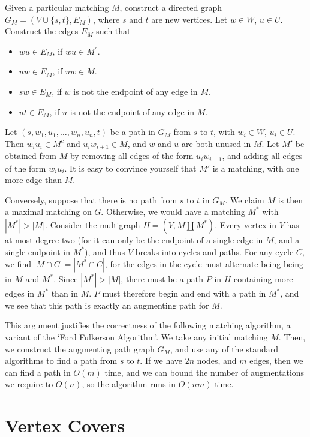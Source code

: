 Given a particular matching $M$, construct a directed graph $G_M = (V \cup \{ s, t \},E_M)$, where $s$ and $t$ are new vertices. Let $w \in W$, $u \in U$. Construct the edges $E_M$ such that
%
\begin{itemize}
    \item $wu \in E_M$, if $wu \in M^c$.
    \item $uw \in E_M$, if $uw \in M$.
    \item $sw \in E_M$, if $w$ is not the endpoint of any edge in $M$.
    \item $ut \in E_M$, if $u$ is not the endpoint of any edge in $M$.
\end{itemize}
%
Let $(s,w_1,u_1,\dots,w_n,u_n,t)$ be a path in $G_M$ from $s$ to $t$, with $w_i \in W$, $u_i \in U$. Then $w_i u_i \in M^c$ and $u_iw_{i+1} \in M$, and $w$ and $u$ are both unused in $M$. Let $M'$ be obtained from $M$ by removing all edges of the form $u_iw_{i+1}$, and adding all edges of the form $w_i u_i$. It is easy to convince yourself that $M'$ is a matching, with one more edge than $M$.

Conversely, suppose that there is no path from $s$ to $t$ in $G_M$. We claim $M$ is then a maximal matching on $G$. Otherwise, we would have a matching $M^*$ with $|M^*| > |M|$. Consider the multigraph $H = (V, M \amalg M^*)$. Every vertex in $V$ has at most degree two (for it can only be the endpoint of a single edge in $M$, and a single endpoint in $M^*$), and thus $V$ breaks into cycles and paths. For any cycle $C$, we find $|M \cap C| = |M^* \cap C|$, for the edges in the cycle must alternate being being in $M$ and $M^*$. Since $|M^*| > |M|$, there must be a path $P$ in $H$ containing more edges in $M^*$ than in $M$. $P$ must therefore begin and end with a path in $M^*$, and we see that this path is exactly an augmenting path for $M$.

This argument justifies the correctness of the following matching algorithm, a variant of the `Ford Fulkerson Algorithm'. We take any initial matching $M$. Then, we construct the augmenting path graph $G_M$, and use any of the standard algorithms to find a path from $s$ to $t$. If we have $2n$ nodes, and $m$ edges, then we can find a path in $O(m)$ time, and we can bound the number of augmentations we require to $O(n)$, so the algorithm runs in $O(nm)$ time.

\section{Vertex Covers}

